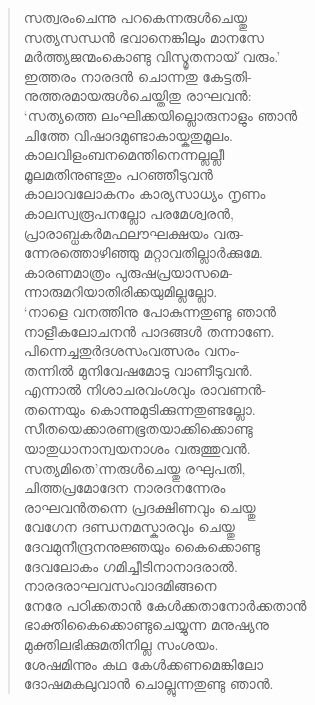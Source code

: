 \begin{verse}
സത്വരംചെന്നു പറകെന്നരുള്‍ചെയ്തു\\
സത്യസന്ധന്‍ ഭവാനെങ്കിലും മാനസേ\\
മര്‍ത്ത്യജന്മംകൊണ്ടു വിസ്മൃതനായ് വരും.’\\
ഇത്തരം നാരദന്‍ ചൊന്നതു കേട്ടതി-\\
നുത്തരമായരുള്‍ചെയ്തിതു രാഘവന്‍:\\
‘സത്യത്തെ ലംഘിക്കയില്ലൊരുനാളും ഞാന്‍\\
ചിത്തേ വിഷാദമുണ്ടാകായ്കതുമൂലം.\\
കാലവിളംബനമെന്തിനെന്നല്ലല്ലീ\\
മൂലമതിനുണ്ടതും പറഞ്ഞീടുവന്‍\\
കാലാവലോകനം കാര്യസാധ്യം നൃണം\\
കാലസ്വരൂപനല്ലോ പരമേശ്വരന്‍,\\
പ്രാരാബ്ധകര്‍മഫലൗഘക്ഷയം വരു-\\
ന്നേരത്തൊഴിഞ്ഞു മറ്റാവതില്ലാര്‍ക്കുമേ.\\
കാരണമാത്രം പുരുഷപ്രയാസമെ-\\
ന്നാരുമറിയാതിരിക്കയുമില്ലല്ലോ.\\
‘നാളെ വനത്തിനു പോകുന്നതുണ്ടു ഞാന്‍\\
നാളീകലോചനന്‍ പാദങ്ങള്‍ തന്നാണേ.\\
പിന്നെച്ചതുര്‍ദശസംവത്സരം വനം-\\
തന്നില്‍ മുനിവേഷമോടു വാണീടുവന്‍.\\
എന്നാല്‍ നിശാചരവംശവും രാവണന്‍-\\
തന്നെയും കൊന്നുമുടിക്കുന്നതുണ്ടല്ലോ.\\
സീതയെക്കാരണഭൂതയാക്കിക്കൊണ്ടു\\
യാതുധാനാന്വയനാശം വരുത്തുവന്‍.\\
സത്യമിതെ’ന്നരുള്‍ചെയ്തു രഘുപതി,\\
ചിത്തപ്രമോദേന നാരദനന്നേരം\\
രാഘവന്‍തന്നെ പ്രദക്ഷിണവും ചെയ്തു\\
വേഗേന ദണ്ഡനമസ്കാരവും ചെയ്തു\\
ദേവമുനീന്ദ്രനനുജ്ഞയും കൈക്കൊണ്ടു\\
ദേവലോകം ഗമിച്ചീടിനാനാദരാല്‍.\\
നാരദരാഘവസംവാദമിങ്ങനെ\\
നേരേ പഠിക്കതാന്‍ കേള്‍ക്കതാനോര്‍ക്കതാന്‍\\
ഭാക്തികൈക്കൊണ്ടുചെയ്യുന്ന മനുഷ്യനു\\
മുക്തിലഭിക്കുമതിനില്ല സംശയം.\\
ശേഷമിന്നും കഥ കേള്‍ക്കണമെങ്കിലോ\\
ദോഷമകലുവാന്‍ ചൊല്ലുന്നതുണ്ടു ഞാന്‍.
\end{verse}

